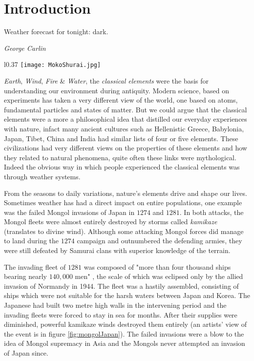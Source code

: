 \chapter{Introduction}\label{chapter:introduction}

\epigraph{Weather forecast for tonight: dark.}{\textit{George Carlin}}

\begin{wrapfigure}{l}{0.37\textwidth}
    \centering\texttt{[image: MokoShurai.jpg]}
    \caption{\small The Mongol fleet destroyed in a typhoon, ink and water on paper, 1847. 
    \textit{Source}: Kikuchi Y\={o}sai / Tokyo National Museum (Public domain)}
    \label{fig:mongolJapan}
\end{wrapfigure}

\emph{Earth}, \emph{Wind}, \emph{Fire} \& \emph{Water}, the \emph{classical elements} were the basis 
for understanding our environment during antiquity. Modern science, based on experiments has taken a very 
different view of the world, one based on atoms, fundamental particles and states of matter. But we could 
argue that the classical elements were a more a philosophical idea that distilled our everyday experiences 
with nature, infact many ancient cultures such as Hellenistic Greece, Babylonia, Japan, Tibet, China and 
India had similar lists of four or five elements. These civilizations had very different views on the 
properties of these elements and how they related to natural phenomena, quite often these links 
were mythological. Indeed the obvious way in which people experienced the classical elements was through
weather systems. 

From the seasons to daily variations, nature's elements drive and shape our lives. Sometimes weather 
has had a direct impact on entire populations, one example was the failed Mongol invasions of Japan 
in $1274$ and $1281$. In both attacks, the Mongol fleets were almost entirely destroyed by storms called 
\emph{kamikaze} (translates to divine wind). Although some attacking Mongol forces did manage to land during 
the $1274$ campaign and outnumbered the defending armies, they were still defeated by Samurai clans with 
superior knowledge of the terrain. 

The invading fleet of $1281$ was composed of "more than four thousand ships bearing nearly $140,000$ men" 
\citep[pg.~17]{mcclain2002japan}, the scale of which was eclipsed only by the allied invasion of Normandy 
in 1944. The fleet was a hastily assembled, consisting of ships which were not suitable for the harsh waters 
between Japan and Korea. The Japanese had built two metre high walls in the intervening period and the invading 
fleets were forced to stay in sea for months. After their supplies were diminished, powerful kamikaze winds 
destroyed them entirely (an artists' view of the event is in figure \ref{fig:mongolJapan}). The failed invasions 
were a blow to the idea of Mongol supremacy in Asia and the Mongols never attempted an invasion of Japan since.

